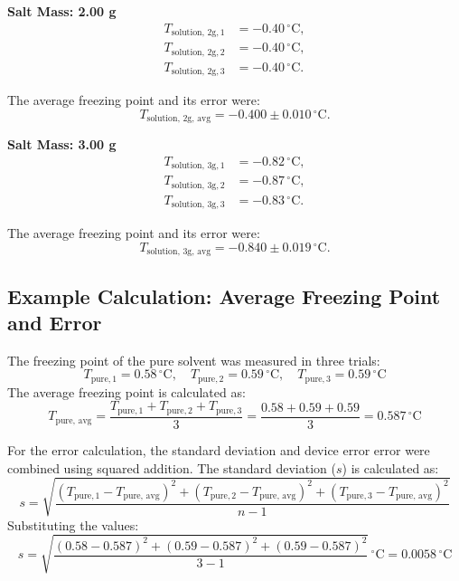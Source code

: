 \documentclass[a4paper,12pt]{article}
\begin{document}
\textbf{Salt Mass: 2.00 g}
\begin{equation*}
\begin{aligned}
    T_{\text{solution, 2g}, 1} &= -0.40 \, ^\circ\text{C}, \\
    T_{\text{solution, 2g}, 2} &= -0.40 \, ^\circ\text{C}, \\
    T_{\text{solution, 2g}, 3} &= -0.40 \, ^\circ\text{C}.
\end{aligned}
\end{equation*}

The average freezing point and its error were:
\begin{equation}
T_{\text{solution, 2g, avg}} = -0.400 \pm 0.010 \, ^\circ\text{C}.
\end{equation}

\textbf{Salt Mass: 3.00 g}
\begin{equation*}
\begin{aligned}
    T_{\text{solution, 3g}, 1} &= -0.82 \, ^\circ\text{C}, \\
    T_{\text{solution, 3g}, 2} &= -0.87 \, ^\circ\text{C}, \\
    T_{\text{solution, 3g}, 3} &= -0.83 \, ^\circ\text{C}.
\end{aligned}
\end{equation*}

The average freezing point and its error were:
\begin{equation}
T_{\text{solution, 3g, avg}} = -0.840 \pm 0.019 \, ^\circ\text{C}.
\end{equation}

\subsection*{Example Calculation: Average Freezing Point \\ and Error}
The freezing point of the pure solvent was measured in three trials:
\[
T_{\text{pure}, 1} = 0.58 \, ^\circ\text{C}, \quad T_{\text{pure}, 2} = 0.59 \, ^\circ\text{C}, \quad T_{\text{pure}, 3} = 0.59 \, ^\circ\text{C}
\]
The average freezing point is calculated as:
\[
T_{\text{pure, avg}} = \frac{T_{\text{pure}, 1} + T_{\text{pure}, 2} + T_{\text{pure}, 3}}{3} = \frac{0.58 + 0.59 + 0.59}{3} = 0.587 \, ^\circ\text{C}
\]

For the error calculation, the standard deviation and device error error were combined using squared addition. The standard deviation ($s$) is calculated as:
\[
s = \sqrt{\frac{(T_{\text{pure}, 1} - T_{\text{pure, avg}})^2 + (T_{\text{pure}, 2} - T_{\text{pure, avg}})^2 + (T_{\text{pure}, 3} - T_{\text{pure, avg}})^2}{n-1}}
\]
Substituting the values:
\[
s = \sqrt{\frac{(0.58 - 0.587)^2 + (0.59 - 0.587)^2 + (0.59 - 0.587)^2}{3 - 1}}\,^\circ\text{C} = 0.0058 \, ^\circ\text{C}
\]
\end{document}
